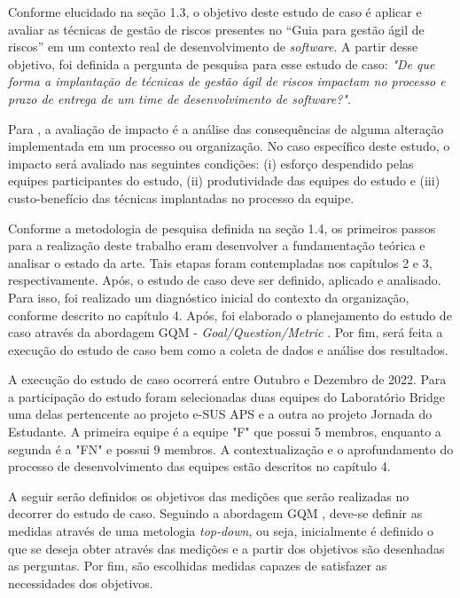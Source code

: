 \documentclass[
    12pt,       %
    openright,      %
    twoside,      %
    a4paper,      %
    english,      %
    french,       %
    spanish,      %
    brazil,       %
    ]{abntex2}
\begin{document}
Conforme elucidado na seção 1.3, o objetivo deste estudo de caso é aplicar e avaliar as técnicas de gestão de riscos presentes no “Guia para gestão ágil de riscos” \cite{Vieira:2020} em um contexto real de desenvolvimento de \textit{software}. A partir desse objetivo, foi definida a pergunta de pesquisa para esse estudo de caso: \textit{"De que forma a implantação de técnicas de gestão ágil de riscos impactam no processo e prazo de entrega de um time de desenvolvimento de software?"}. 

Para , a avaliação de impacto é a análise das consequências de alguma alteração implementada em um processo ou organização. No caso específico deste estudo, o impacto será avaliado nas seguintes condições: (i) esforço despendido pelas equipes participantes do estudo, (ii) produtividade das equipes do estudo e (iii) custo-benefício das técnicas implantadas no processo da equipe. 

Conforme a metodologia de pesquisa definida na seção 1.4, os primeiros passos para a realização deste trabalho eram desenvolver a fundamentação teórica e analisar o estado da arte. Tais etapas foram contempladas nos capítulos 2 e 3, respectivamente. Após, o estudo de caso deve ser definido, aplicado e analisado. Para isso, foi realizado um diagnóstico inicial do contexto da organização, conforme descrito no capítulo 4. Após, foi elaborado o planejamento do estudo de caso através da abordagem GQM - \textit{Goal/Question/Metric} \cite{KOZIOLEK:2005}. Por fim, será feita a execução do estudo de caso bem como a coleta de dados e análise dos resultados.

A execução do estudo de caso ocorrerá entre Outubro e Dezembro de 2022. Para a participação do estudo foram selecionadas duas equipes do Laboratório Bridge uma delas pertencente ao projeto e-SUS APS e a outra ao projeto Jornada do Estudante. A primeira equipe é a equipe "F" que possui 5 membros, enquanto a segunda é a "FN" e possui 9 membros. A contextualização e o aprofundamento do processo de desenvolvimento das equipes estão descritos no capítulo 4.

A seguir serão definidos os objetivos das medições que serão realizadas no decorrer do estudo de caso. Seguindo a abordagem GQM \cite{KOZIOLEK:2005}, deve-se definir as medidas através de uma metologia \textit{top-down}, ou seja, inicialmente é definido o que se deseja obter através das medições e a partir dos objetivos são desenhadas as perguntas. Por fim, são escolhidas medidas capazes de satisfazer as necessidades dos objetivos.
\end{document}

